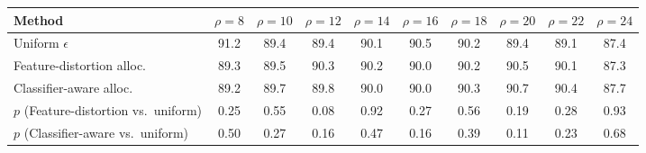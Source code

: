 \begin{tabular}{lccccccccc}
\toprule
Method & $\rho=8$ & $\rho=10$ & $\rho=12$ & $\rho=14$ & $\rho=16$ & $\rho=18$ & $\rho=20$ & $\rho=22$ & $\rho=24$ \\
\midrule
Uniform $\epsilon$ & 91.2 & 89.4 & 89.4 & 90.1 & 90.5 & 90.2 & 89.4 & 89.1 & 87.4 \\
Feature-distortion alloc. & 89.3 & 89.5 & 90.3 & 90.2 & 90.0 & 90.2 & 90.5 & 90.1 & 87.3 \\
Classifier-aware alloc. & 89.2 & 89.7 & 89.8 & 90.0 & 90.0 & 90.3 & 90.7 & 90.4 & 87.7 \\
\quad $p$ (Feature-distortion vs.\ uniform) & 0.25 & 0.55 & 0.08 & 0.92 & 0.27 & 0.56 & 0.19 & 0.28 & 0.93 \\
\quad $p$ (Classifier-aware vs.\ uniform) & 0.50 & 0.27 & 0.16 & 0.47 & 0.16 & 0.39 & 0.11 & 0.23 & 0.68 \\
\bottomrule
\end{tabular}
